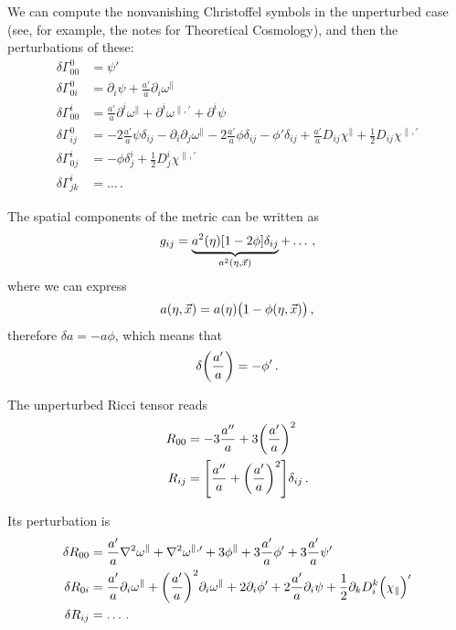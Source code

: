 \documentclass[main.tex]{subfiles}
\begin{document}
We can compute the nonvanishing Christoffel symbols in the unperturbed case (see, for example, the notes for Theoretical Cosmology), and then the perturbations of these: 
%
\begin{align}
\delta \Gamma^{0}_{00} &= \psi '  \\
\delta \Gamma^{0}_{0i} &= \partial_{i} \psi + \frac{a'}{a} \partial_{i} \omega^{\parallel}  \\
\delta \Gamma^{i}_{00} &= \frac{a'}{a} \partial^{i} \omega^{\parallel} + \partial^{i} \omega^{\parallel, \prime} + \partial^{i} \psi  \\
\delta \Gamma^{0}_{ij} &= -2 \frac{a'}{a} \psi \delta_{ij} - \partial_{i} \partial_{j} \omega^{\parallel} - 2 \frac{a'}{a} \phi \delta_{ij} 
- \phi ' \delta_{ij} + \frac{a'}{a} D_{ij} \chi^{\parallel} + \frac{1}{2} D_{ij} \chi^{\parallel, \prime}  \\
\delta \Gamma^{i}_{0j} &= - \phi \delta^{i}_{j} + \frac{1}{2} D^{i}_{j} \chi^{\parallel, \prime}  \\
\delta \Gamma^{i}_{jk} &= \dots
\,.
\end{align}

The spatial components of the metric can be written as 
%
\begin{align}
g_{ij} = \underbrace{a^2(\eta ) \qty[1 - 2 \phi ] \delta_{ij}}_{a^2(\eta , \vec{x})} + \dots
\,,
\end{align}
%
where we can express 
%
\begin{align}
a(\eta , \vec{x}) = a(\eta ) \qty(1 - \phi (\eta , \vec{x}))
\,,
\end{align}
%
therefore \(\delta a = - a \phi \), which means that 
%
\begin{align}
\delta \qty( \frac{a^{\prime}}{a}) = - \phi '
\,.
\end{align}

The unperturbed Ricci tensor reads 
%
\begin{align}
R_{00} &= - 3 \frac{a''}{a} + 3 \qty( \frac{a'}{a})^2  \\
R_{ij} &=  \qty[\frac{a''}{a} + \qty(\frac{a'}{a})^2] \delta_{ij} 
\,.
\end{align}

Its perturbation is 
%
\begin{align}
\delta R_{00} &= \frac{a'}{a} \nabla^2 \omega^{\parallel} + \nabla^2 \omega^{\parallel, \prime} + 3 \phi^{\parallel} + 3 \frac{a'}{a} \phi' + 3 \frac{a'}{a} \psi '  \\
\delta R_{0i} &= \frac{a'}{a} \partial_{i} \omega^{\parallel} + \qty(\frac{a'}{a})^2 \partial_{i} \omega^{\parallel} +2 \partial_{i} \phi' + 2 \frac{a'}{a} \partial_{i} \psi + \frac{1}{2} \partial_{k} D^{k}_i \qty(\chi_{\parallel})'  \\
\delta R_{ij} &= \dots
\,.
\end{align}
\end{document}
